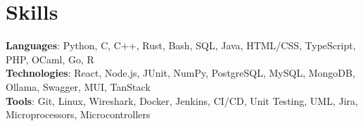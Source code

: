 \documentclass[letterpaper,11pt]{article}
\begin{document}
\section{Skills}
 \begin{itemize}[leftmargin=0.15in, label={}]
    \small{\item{
     \textbf{Languages}{: Python, C, C++, Rust, Bash, SQL, Java, HTML/CSS, TypeScript, PHP, OCaml, Go, R} \\
     \textbf{Technologies}{: React, Node.js, JUnit, NumPy, PostgreSQL, MySQL, MongoDB, Ollama, Swagger, MUI, TanStack} \\
     \textbf{Tools}{: Git, Linux, Wireshark, Docker, Jenkins, CI/CD, Unit Testing, UML, Jira, Microprocessors, Microcontrollers}
    }}
 \end{itemize}

\end{document}
